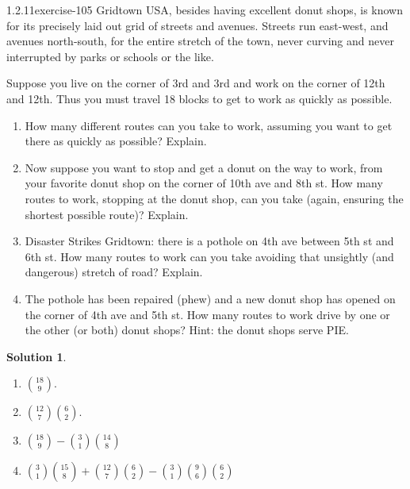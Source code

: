 \documentclass[twoside,11pt,]{book}
\numberwithin{equation}{chapter}
\begin{document}
\begin{divisionsolution}{1.2.11}{}{exercise-105}%
\hypertarget{p-1702}{}%
Gridtown USA, besides having excellent donut shops, is known for its precisely laid out grid of streets and avenues. Streets run east-west, and avenues north-south, for the entire stretch of the town, never curving and never interrupted by parks or schools or the like.%
\par
\hypertarget{p-1703}{}%
Suppose you live on the corner of 3rd and 3rd and work on the corner of 12th and 12th. Thus you must travel 18 blocks to get to work as quickly as possible.\leavevmode%
\begin{enumerate}[label=(\alph*)]
\item\hypertarget{li-1174}{}\hypertarget{p-1704}{}%
How many different routes can you take to work, assuming you want to get there as quickly as possible? Explain.%
\item\hypertarget{li-1175}{}\hypertarget{p-1705}{}%
Now suppose you want to stop and get a donut on the way to work, from your favorite donut shop on the corner of 10th ave and 8th st. How many routes to work, stopping at the donut shop, can you take (again, ensuring the shortest possible route)? Explain.%
\item\hypertarget{li-1176}{}\hypertarget{p-1706}{}%
Disaster Strikes Gridtown: there is a pothole on 4th ave between 5th st and 6th st. How many routes to work can you take avoiding that unsightly (and dangerous) stretch of road? Explain.%
\item\hypertarget{li-1177}{}\hypertarget{p-1707}{}%
The pothole has been repaired (phew) and a new donut shop has opened on the corner of 4th ave and 5th st. How many routes to work drive by one or the other (or both) donut shops? Hint: the donut shops serve PIE.%
\end{enumerate}
%
\par\smallskip%
\noindent\textbf{Solution 1}.\quad%
\hypertarget{p-1708}{}%
\leavevmode%
\begin{enumerate}[label=(\alph*)]
\item\hypertarget{li-1178}{}\hypertarget{p-1709}{}%
\({18 \choose 9}\).%
\item\hypertarget{li-1179}{}\hypertarget{p-1710}{}%
\(\binom{12}{7}\binom{6}{2}\).%
\item\hypertarget{li-1180}{}\hypertarget{p-1711}{}%
\({18 \choose 9} - {3 \choose 1}{14 \choose 8}\)%
\item\hypertarget{li-1181}{}\hypertarget{p-1712}{}%
\({3\choose 1}{15 \choose 8} + {12 \choose 7}{6 \choose 2} - {3\choose 1}{9 \choose 6}{6 \choose 2}\)%

\end{enumerate}
\end{divisionsolution}
\end{document}
